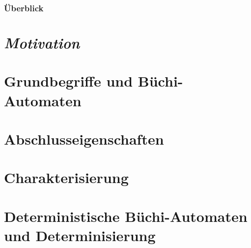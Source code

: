   \begin{frame}
    \frametitle{Überblick}
    \tableofcontents
  \end{frame}

  \section[Motiv.]{\protect\emph{Motivation}}
  
  
  \section[Büchi-Aut.]{Grundbegriffe und Büchi-Automaten}
  

  \section[Abschlusseig.]{Abschlusseigenschaften}
  
  
  \section[Charakt.]{Charakterisierung}
  

  \section[Determinismus]{Deterministische Büchi-Automaten und Determinisierung}
  

